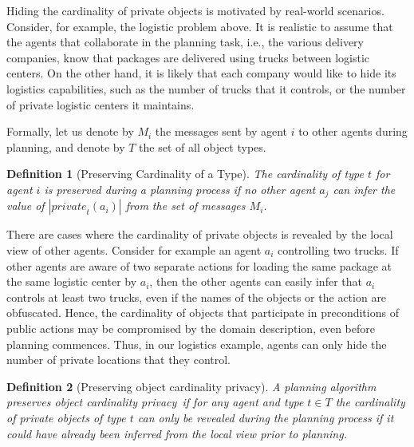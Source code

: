 \documentclass[letterpaper]{article}
\newcommand{\private}[2]{\textit{private}_{#1}(#2)}
\newtheorem{definition}{Definition}
\newcommand\cprivacy{object cardinality privacy}
\theoremstyle{definition}
\begin{document}
Hiding the cardinality of private objects is motivated by real-world scenarios. Consider, for example, the logistic problem above. It is realistic to assume that the agents that collaborate in the planning task, i.e., the various delivery companies, know that packages are delivered using trucks between logistic centers. On the other hand, it is likely that each company would like to hide its logistics capabilities, such as the number of trucks that it controls, or the number of private logistic centers it maintains.

Formally, let us denote by $M_i$ the messages sent by agent $i$ to other agents during planning, and denote by $T$ the set of all object types.
\begin{definition}[Preserving Cardinality of a Type]
The cardinality of type $t$ for agent $i$ is preserved during a planning process if no other agent $a_j$ can infer the value of $|\private{t}{a_i}|$ from the set of messages $M_i$.
\end{definition}

There are cases where the cardinality of private objects is revealed by the local view of other agents. Consider for example an agent $a_i$ controlling two trucks. If other agents are aware of two separate actions for loading the same package at the same logistic center by $a_i$, then the other agents can easily infer that $a_i$ controls at least two trucks, even if the names of the objects or the action are obfuscated. %
Hence, the cardinality of objects that participate in preconditions of public actions may be compromised by the domain description, even before planning commences. %
Thus, in our logistics example, agents can only hide the number of private locations that they control.


\begin{definition}[Preserving \cprivacy]
A planning algorithm preserves \cprivacy\ if for any agent and type $t\in T$ the cardinality of private objects of type $t$ can only be revealed during the planning process if it could have already been inferred from the local view prior to planning.
\label{def:cprivacy}
\end{definition}
\end{document}
